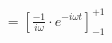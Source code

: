 \documentclass[preview]{standalone}
\begin{document}
\begin{align*}
&=[\frac{-1}{i\omega}\cdot e^{-i\omega t}]_{-1}^{+1} \\
\end{align*}
\end{document}
